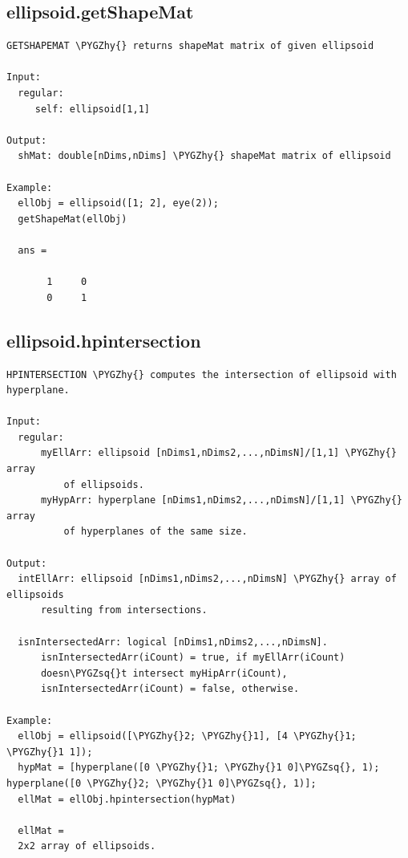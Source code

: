 \documentclass[letterpaper,10pt,english]{sphinxmanual}
\def\PYGZhy{\char`\-}
\def\PYGZsq{\char`\'}
\begin{document}
\subsection{ellipsoid.getShapeMat}
\label{chap_functions:ellipsoid-getshapemat}
\begin{Verbatim}[commandchars=\\\{\}]
GETSHAPEMAT \PYGZhy{} returns shapeMat matrix of given ellipsoid

Input:
  regular:
     self: ellipsoid[1,1]

Output:
  shMat: double[nDims,nDims] \PYGZhy{} shapeMat matrix of ellipsoid

Example:
  ellObj = ellipsoid([1; 2], eye(2));
  getShapeMat(ellObj)

  ans =

       1     0
       0     1
\end{Verbatim}


\subsection{ellipsoid.hpintersection}
\label{chap_functions:ellipsoid-hpintersection}
\begin{Verbatim}[commandchars=\\\{\}]
HPINTERSECTION \PYGZhy{} computes the intersection of ellipsoid with hyperplane.

Input:
  regular:
      myEllArr: ellipsoid [nDims1,nDims2,...,nDimsN]/[1,1] \PYGZhy{} array
          of ellipsoids.
      myHypArr: hyperplane [nDims1,nDims2,...,nDimsN]/[1,1] \PYGZhy{} array
          of hyperplanes of the same size.

Output:
  intEllArr: ellipsoid [nDims1,nDims2,...,nDimsN] \PYGZhy{} array of ellipsoids
      resulting from intersections.

  isnIntersectedArr: logical [nDims1,nDims2,...,nDimsN].
      isnIntersectedArr(iCount) = true, if myEllArr(iCount)
      doesn\PYGZsq{}t intersect myHipArr(iCount),
      isnIntersectedArr(iCount) = false, otherwise.

Example:
  ellObj = ellipsoid([\PYGZhy{}2; \PYGZhy{}1], [4 \PYGZhy{}1; \PYGZhy{}1 1]);
  hypMat = [hyperplane([0 \PYGZhy{}1; \PYGZhy{}1 0]\PYGZsq{}, 1); hyperplane([0 \PYGZhy{}2; \PYGZhy{}1 0]\PYGZsq{}, 1)];
  ellMat = ellObj.hpintersection(hypMat)

  ellMat =
  2x2 array of ellipsoids.
\end{Verbatim}
\end{document}
